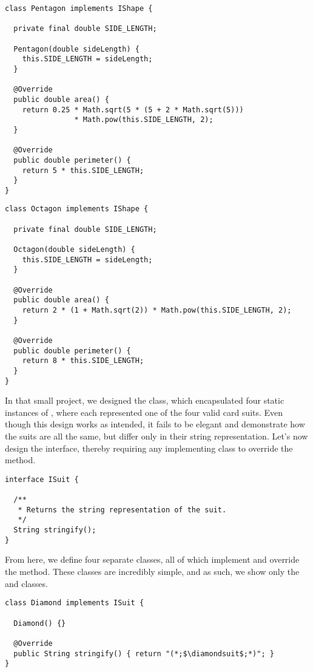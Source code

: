 \begin{lstlisting}[language=MyJava]
class Pentagon implements IShape {
  
  private final double SIDE_LENGTH;

  Pentagon(double sideLength) { 
    this.SIDE_LENGTH = sideLength; 
  }

  @Override
  public double area() {
    return 0.25 * Math.sqrt(5 * (5 + 2 * Math.sqrt(5))) 
                * Math.pow(this.SIDE_LENGTH, 2);
  }

  @Override
  public double perimeter() {
    return 5 * this.SIDE_LENGTH;
  }
}
\end{lstlisting}

\enlargethispage{-7\baselineskip}
\begin{lstlisting}[language=MyJava]
class Octagon implements IShape {

  private final double SIDE_LENGTH;

  Octagon(double sideLength) { 
    this.SIDE_LENGTH = sideLength; 
  }

  @Override
  public double area() {
    return 2 * (1 + Math.sqrt(2)) * Math.pow(this.SIDE_LENGTH, 2);
  }

  @Override
  public double perimeter() {
    return 8 * this.SIDE_LENGTH;
  }
}
\end{lstlisting}

In that small project, we designed the  class, which encapsulated four static instances of , where each represented one of the four valid card suits. 
Even though this design works as intended, it fails to be elegant and demonstrate how the suits are all the same, but differ only in their string representation. 
Let's now design the  interface, thereby requiring any implementing class to override the  method.

\begin{lstlisting}[language=MyJava]
interface ISuit {

  /**
   * Returns the string representation of the suit.
   */
  String stringify();
}
\end{lstlisting}

From here, we define four separate classes, all of which implement  and override the  method. 
These classes are incredibly simple, and as such, we show only the  and  classes.

\begin{lstlisting}[language=MyJava]
class Diamond implements ISuit {
  
  Diamond() {}

  @Override
  public String stringify() { return "(*;$\diamondsuit$;*)"; }
}
\end{lstlisting}

